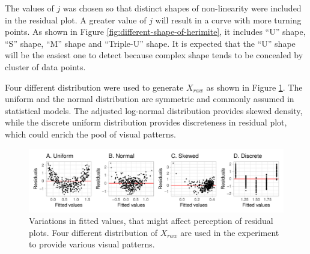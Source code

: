 \documentclass[]{interact}
\theoremstyle{plain}%
\theoremstyle{definition}
\theoremstyle{remark}
\begin{document}
\begin{table}

\caption{\label{tab:model-factor-table}Description of all factors involved in the non-linear and heteroskedasticity studies.}
\centering
{}
\end{table}

The values of \(j\) was chosen so that distinct shapes of non-linearity
were included in the residual plot. A greater value of \(j\) will result
in a curve with more turning points. As shown in Figure
\ref{fig:different-shape-of-herimite}, it includes ``U'' shape, ``S''
shape, ``M'' shape and ``Triple-U'' shape. It is expected that the ``U''
shape will be the easiest one to detect because complex shape tends to
be concealed by cluster of data points.

Four different distribution were used to generate \(X_{raw}\) as shown
in Figure \ref{fig:different-dist}. The uniform and the normal
distribution are symmetric and commonly assumed in statistical models.
The adjusted log-normal distribution provides skewed density, while the
discrete uniform distribution provides discreteness in residual plot,
which could enrich the pool of visual patterns.

\begin{figure}

{\centering \includegraphics[width=1\linewidth]{paper_comparison_files/figure-latex/different-dist-1} 

}

\caption{Variations in fitted values, that might affect perception of residual plots. Four different distribution of $X_{raw}$ are used in the experiment to provide various visual patterns.}\label{fig:different-dist}
\end{figure}
\end{document}
